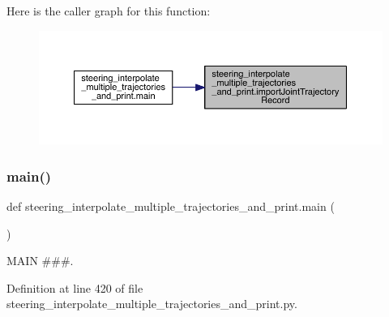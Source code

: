 Here is the caller graph for this function\+:\nopagebreak
\begin{figure}[H]
\begin{center}
\leavevmode
\includegraphics[width=350pt]{namespacesteering__interpolate__multiple__trajectories__and__print_a5ecaa1f0c7b7379d5d217b69ecbcfafc_icgraph}
\end{center}
\end{figure}
\mbox{\label{namespacesteering__interpolate__multiple__trajectories__and__print_a17184534fa48653e3e1957dd8fe17257}} 
\subsubsection{\texorpdfstring{main()}{main()}}
{\footnotesize\ttfamily def steering\+\_\+interpolate\+\_\+multiple\+\_\+trajectories\+\_\+and\+\_\+print.\+main (\begin{DoxyParamCaption}{ }\end{DoxyParamCaption})}



M\+A\+IN \#\#\#. 



Definition at line 420 of file steering\+\_\+interpolate\+\_\+multiple\+\_\+trajectories\+\_\+and\+\_\+print.\+py.



